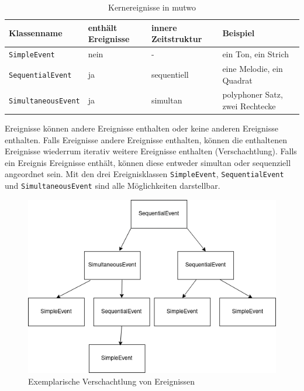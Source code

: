 \documentclass[12pt,a4paper,ngerman]{article}
\begin{document}
\begin{table}[h!]
    \begin{center}
        \begin{tabular}{l l l l} 
            \hline
            Klassenname & enthält Ereignisse & innere Zeitstruktur & Beispiel \\ [0.5ex] 
            \hline\hline
            \texttt{SimpleEvent} & nein & - & ein Ton, ein Strich \\ 
            \texttt{SequentialEvent} & ja & sequentiell & eine Melodie, ein Quadrat \\ 
            \texttt{SimultaneousEvent} & ja & simultan & polyphoner Satz, zwei Rechtecke \\ [1ex] 
            \hline
        \end{tabular}
    \end{center}

    \caption{Kernereignisse in mutwo}
\end{table}

Ereignisse können andere Ereignisse enthalten oder keine anderen Ereignisse enthalten.
Falls Ereignisse andere Ereignisse enthalten, können die enthaltenen Ereignisse wiederrum iterativ weitere Ereignisse enthalten (Verschachtlung).
Falls ein Ereignis Ereignisse enthält, können diese entweder simultan oder sequenziell angeordnet sein.
Mit den drei Ereignisklassen \texttt{SimpleEvent}, \texttt{SequentialEvent} und \texttt{SimultaneousEvent} sind alle Möglichkeiten darstellbar.

\begin{figure}[h!]
    \begin{center}
        \includegraphics[scale=0.5]{pictures/nested_event.png}

        \caption{Exemplarische Verschachtlung von Ereignissen}
    \end{center}
\end{figure}
\end{document}

